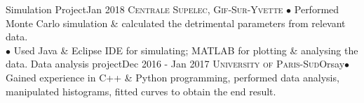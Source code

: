 %
%
%

\begin{projects}
	\project
	{Simulation Project}{Jan 2018}
		{\textsc{Centrale Supelec, Gif-Sur-Yvette} {} {$\bullet$ Performed Monte Carlo simulation \& calculated the detrimental parameters from relevant data.\\ $\bullet$ Used Java \& Eclipse IDE for simulating; MATLAB for plotting \& analysing the data.}}
	\project
	{Data analysis project}{Dec 2016 - Jan 2017}
		{\textsc{University of Paris-Sud}}{Orsay}{}{$\bullet$ Gained experience in C++ \& Python programming, performed data analysis, manipulated histograms, fitted curves to obtain the end result.}	
\end{projects}